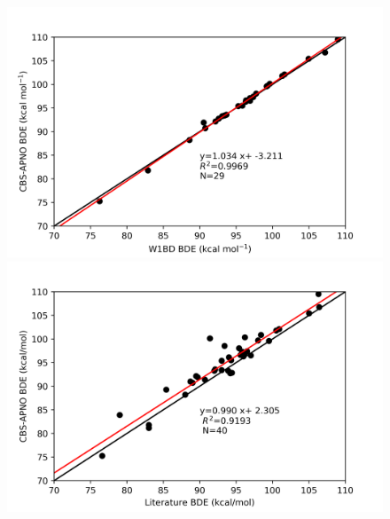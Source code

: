 \begin{figure}[H]\ContinuedFloat
\hspace*{-1.8cm}
\begin{minipage}{8cm}
  \centering
  \includegraphics[width=\textwidth]{figures/w1bd-cbsapno}
\end{minipage}%
\begin{minipage}{8cm}
  \centering
  \includegraphics[width=\textwidth]{figures/lit-cbsapno}
\end{minipage}


\end{figure}
